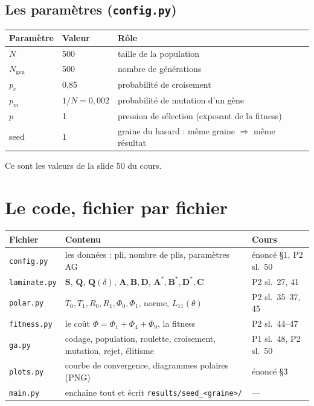 \documentclass[11pt,a4paper]{article}
\newcommand{\As}{\mathbf{A}^{*}}
\newcommand{\Bs}{\mathbf{B}^{*}}
\newcommand{\Ds}{\mathbf{D}^{*}}
\newcommand{\Cm}{\mathbf{C}}
\newcommand{\Q}{\mathbf{Q}}
\newcommand{\Sm}{\mathbf{S}}
\newcommand{\code}[1]{\texttt{#1}}
\begin{document}
\subsection{Les paramètres (\code{config.py})}
\begin{center}
\begin{tabular}{l l l}
\toprule
Paramètre & Valeur & Rôle\\
\midrule
$N$ & 500 & taille de la population\\
$N_{\text{gen}}$ & 500 & nombre de générations\\
$p_c$ & 0,85 & probabilité de croisement\\
$p_m$ & $1/N = 0{,}002$ & probabilité de mutation d'un gène\\
$p$ & 1 & pression de sélection (exposant de la fitness)\\
seed & 1 & graine du hasard : même graine $\Rightarrow$ même résultat\\
\bottomrule
\end{tabular}
\end{center}
Ce sont les valeurs de la slide 50 du cours.

\section{Le code, fichier par fichier}
\begin{center}
\begin{tabularx}{\linewidth}{l X l}
\toprule
Fichier & Contenu & Cours\\
\midrule
\code{config.py} & les données : pli, nombre de plis, paramètres AG & énoncé §1, P2 sl.~50\\
\code{laminate.py} & $\Sm$, $\Q$, $\Q(\delta)$, $\mathbf{A},\mathbf{B},\mathbf{D}$, $\As,\Bs,\Ds,\Cm$ & P2 sl.~27, 41\\
\code{polar.py} & $T_0,T_1,R_0,R_1,\Phi_0,\Phi_1$, norme, $L_{11}(\theta)$ & P2 sl.~35--37, 45\\
\code{fitness.py} & le coût $\Phi = \Phi_1 + \Phi_4 + \Phi_9$, la fitness & P2 sl.~44--47\\
\code{ga.py} & codage, population, roulette, croisement, mutation, rejet, élitisme & P1 sl.~48, P2 sl.~50\\
\code{plots.py} & courbe de convergence, diagrammes polaires (PNG) & énoncé §3\\
\code{main.py} & enchaîne tout et écrit \code{results/seed\_<graine>/} & ---\\
\bottomrule
\end{tabularx}
\end{center}
\end{document}

